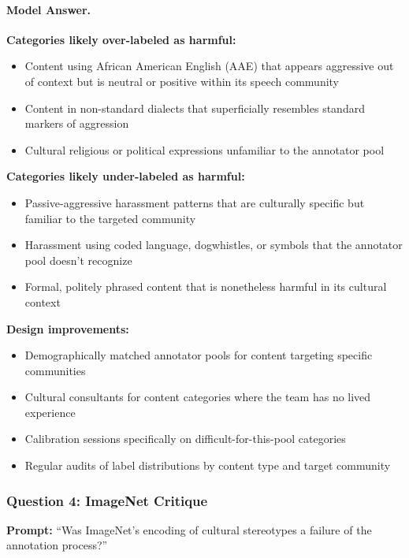 \paragraph{Model Answer.}

\textbf{Categories likely over-labeled as harmful:}
\begin{itemize}
    \item Content using African American English (AAE) that appears aggressive out of context but is neutral or positive within its speech community
    \item Content in non-standard dialects that superficially resembles standard markers of aggression
    \item Cultural religious or political expressions unfamiliar to the annotator pool
\end{itemize}

\textbf{Categories likely under-labeled as harmful:}
\begin{itemize}
    \item Passive-aggressive harassment patterns that are culturally specific but familiar to the targeted community
    \item Harassment using coded language, dogwhistles, or symbols that the annotator pool doesn't recognize
    \item Formal, politely phrased content that is nonetheless harmful in its cultural context
\end{itemize}

\textbf{Design improvements:}
\begin{itemize}
    \item Demographically matched annotator pools for content targeting specific communities
    \item Cultural consultants for content categories where the team has no lived experience
    \item Calibration sessions specifically on difficult-for-this-pool categories
    \item Regular audits of label distributions by content type and target community
\end{itemize}

\subsubsection{Question 4: ImageNet Critique}

\textbf{Prompt:} ``Was ImageNet's encoding of cultural stereotypes a failure of the annotation process?''

